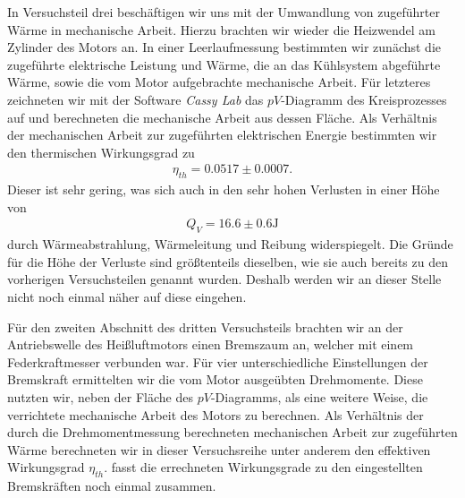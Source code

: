 In Versuchsteil drei beschäftigen wir uns mit der Umwandlung von zugeführter Wärme in mechanische Arbeit. Hierzu brachten wir wieder die Heizwendel am Zylinder des Motors an. In einer Leerlaufmessung bestimmten wir zunächst die zugeführte elektrische Leistung und Wärme, die an das Kühlsystem abgeführte Wärme, sowie die vom Motor aufgebrachte mechanische Arbeit. Für letzteres zeichneten wir mit der Software \textit{Cassy Lab} das $pV$-Diagramm des Kreisprozesses auf und berechneten die mechanische Arbeit aus dessen Fläche. Als Verhältnis der mechanischen Arbeit zur zugeführten elektrischen Energie bestimmten wir den thermischen Wirkungsgrad zu
\begin{align*}
  \eta_{th} = 0.0517 \pm 0.0007.
\end{align*}
Dieser ist sehr gering, was sich auch in den sehr hohen Verlusten in einer Höhe von
\begin{align*}
    Q_V = 16.6 \pm 0.6 \si{\joule}
\end{align*}
durch Wärmeabstrahlung, Wärmeleitung und Reibung widerspiegelt. Die Gründe für die Höhe der Verluste sind größtenteils dieselben, wie sie auch bereits zu den vorherigen Versuchsteilen genannt wurden. Deshalb werden wir an dieser Stelle nicht noch einmal näher auf diese eingehen.

Für den zweiten Abschnitt des dritten Versuchsteils brachten wir an der Antriebswelle des Heißluftmotors einen Bremszaum an, welcher mit einem Federkraftmesser verbunden war. Für vier unterschiedliche Einstellungen der Bremskraft ermittelten wir die vom Motor ausgeübten Drehmomente. Diese nutzten wir, neben der Fläche des $pV$-Diagramms, als eine weitere Weise, die verrichtete mechanische Arbeit des Motors zu berechnen. Als Verhältnis der durch die Drehmomentmessung berechneten mechanischen Arbeit zur zugeführten Wärme berechneten wir in dieser Versuchsreihe unter anderem den effektiven Wirkungsgrad $\eta_{th}$.  fasst die errechneten Wirkungsgrade zu den eingestellten Bremskräften noch einmal zusammen.

